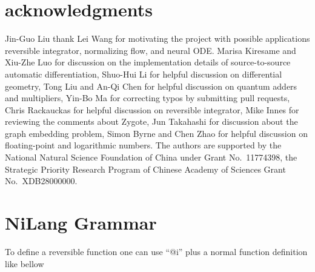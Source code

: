 \documentclass[aps,twocolumn,longbibliography,english,superscriptaddress]{revtex4-1}
\newcommand{\<}{\langle}
\renewcommand{\>}{\rangle}
\newcommand{\blue}[1]{[{\bf  \color{blue}{JG: #1}}]}
\theoremstyle{definition}\newtheorem{definition}{\textit{Definition}}
\begin{document}

\section{acknowledgments}
Jin-Guo Liu thank Lei Wang for motivating the project with possible applications reversible integrator, normalizing flow, and neural ODE.
Marisa Kiresame and Xiu-Zhe Luo for discussion on the implementation details of source-to-source automatic differentiation,
Shuo-Hui Li for helpful discussion on differential geometry, Tong Liu and An-Qi Chen for helpful discussion on quantum adders and multipliers, Yin-Bo Ma for correcting typos by submitting pull requests, Chris Rackauckas for helpful discussion on reversible integrator, Mike Innes for reviewing the comments about Zygote, Jun Takahashi for discussion about the graph embedding problem, Simon Byrne and Chen Zhao for helpful discussion on floating-point and logarithmic numbers.
The authors are supported by the National Natural Science Foundation of China under Grant No.~11774398, the Strategic Priority Research Program of Chinese Academy of Sciences Grant No.~XDB28000000.




\pagebreak
\appendix

\section{NiLang Grammar}\label{app:grammar}

To define a reversible function one can use ``@i'' plus a normal function definition like bellow
\end{document}
